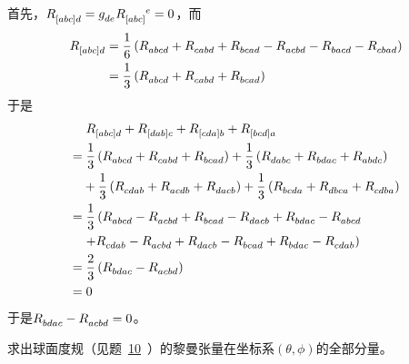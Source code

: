 \begin{xiti}
	\begin{zm}
		首先，$\tensor{R}{_{[abc]}_d}= \tensor{g}{_d_e} \tensor{R}{_{[abc]}^e} =0 $，而
		\begin{align*}
		\tensor{R}{_{[abc]}_d}&=\frac{1}{6} \left( \tensor{R}{_a_b_c_d}+ \tensor{R}{_c_a_b_d}+ \tensor{R}{_b_c_a_d}- \tensor{R}{_a_c_b_d}- \tensor{R}{_b_a_c_d}- \tensor{R}{_c_b_a_d} \right)\\
		&=\frac{1}{3} \left( \tensor{R}{_a_b_c_d}+ \tensor{R}{_c_a_b_d}+ \tensor{R}{_b_c_a_d} \right)
		\end{align*}
		于是
		\begin{align*}
		&\;\tensor{R}{_{[abc]}_d} + \tensor{R}{_{[dab]c}} + \tensor{R}{_{[cda]b}} + \tensor{R}{_{[bcd]a}}\\
		=&\; \frac{1}{3} \left( \tensor{R}{_a_b_c_d}+ \tensor{R}{_c_a_b_d}+ \tensor{R}{_b_c_a_d} \right)+\frac{1}{3} \left( \tensor{R}{_d_a_b_c}+ \tensor{R}{_b_d_a_c}+ \tensor{R}{_a_b_d_c} \right)\\
		&+\frac{1}{3} \left( \tensor{R}{_c_d_a_b}+ \tensor{R}{_a_c_d_b}+ \tensor{R}{_d_a_c_b} \right)+\frac{1}{3} \left( \tensor{R}{_b_c_d_a}+ \tensor{R}{_d_b_c_a}+ \tensor{R}{_c_d_b_a} \right) \\
		=&\; \frac{1}{3} \left( \tensor{R}{_a_b_c_d}- \tensor{R}{_a_c_b_d}+ \tensor{R}{_b_c_a_d}- \tensor{R}{_d_a_c_b}+ \tensor{R}{_b_d_a_c}- \tensor{R}{_a_b_c_d}\right.\\
		&\left.+\tensor{R}{_c_d_a_b}- \tensor{R}{_a_c_b_d}+ \tensor{R}{_d_a_c_b}- \tensor{R}{_b_c_a_d}+ \tensor{R}{_b_d_a_c}- \tensor{R}{_c_d_a_b} \right)\\
		=&\; \frac{2}{3} \left( \tensor{R}{_b_d_a_c}- \tensor{R}{_a_c_b_d} \right)\\
		=&\;0
		\end{align*}
		于是$\tensor{R}{_b_d_a_c}- \tensor{R}{_a_c_b_d}=0$。
	\end{zm}
	
	\item \hypertarget{2.13}{}求出球面度规（见题~\hyperlink{2.10}{10}~）的黎曼张量在坐标系$(\theta,\phi)$的全部分量。
	

\end{xiti}
